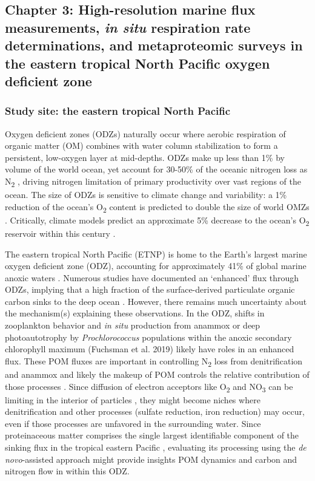 \documentclass[12pt, letterpaper, twoside]{article}
\begin{document}
\subsection{Chapter 3: High-resolution marine flux measurements, \textit{in situ} respiration rate determinations, and metaproteomic surveys in the eastern tropical North Pacific oxygen deficient zone}

\subsubsection{Study site: the eastern tropical North Pacific}

Oxygen deficient zones (ODZs) naturally occur where aerobic respiration of organic matter (OM) combines with water column stabilization to form a persistent, low-oxygen layer at mid-depths. ODZs make up less than 1\% by volume of the world ocean, yet account for 30-50\% of the oceanic nitrogen loss as N\textsubscript{2} \cite{devries_marine_2013}, driving nitrogen limitation of primary productivity over vast regions of the ocean. The size of ODZs is sensitive to climate change and variability: a 1\% reduction of the ocean’s  O\textsubscript{2} content is predicted to double the size of world OMZs \cite{deutsch_climate-forced_2011}. Critically, climate models predict an approximate 5\% decrease to the ocean’s O\textsubscript{2} reservoir within this century \cite{bopp_multiple_2013}. 

The eastern tropical North Pacific (ETNP) is home to the Earth’s largest marine oxygen deficient zone (ODZ), accounting for approximately 41\% of global marine anoxic waters \cite{paulmier_oxygen_2009}. Numerous studies have documented an ‘enhanced’ flux through ODZs, implying that a high fraction of the surface-derived particulate organic carbon sinks to the deep ocean \cite{devol_role_2001, van_mooy_impact_2002, keil_multiproxy_2016}. However, there remains much uncertainty about the mechanism(s) explaining these observations. In the ODZ, shifts in zooplankton behavior \cite{keil_multiproxy_2016} and \textit{in situ} production from anammox \cite{ganesh_single_2018} or deep photoautotrophy by \textit{Prochlorococcus} populations within the anoxic secondary chlorophyll maximum (Fuchsman et al. 2019) likely have roles in an enhanced flux. These POM fluxes are important in controlling N\textsubscript{2} loss from denitrification and anammox \cite{fuchsman_cyanobacteria_2019} and likely the makeup of POM controls the relative contribution of those processes \cite{babbin_organic_2014}. Since diffusion of electron acceptors like O\textsubscript{2} and NO\textsubscript{3} can be limiting in the interior of particles \cite{ploug_ballast_2008, ploug_small-scale_2001, bianchi_global_2018}, they might become niches where denitrification and other processes (sulfate reduction, iron reduction) may occur, even if those processes are unfavored in the surrounding water.  Since proteinaceous matter comprises the single largest identifiable component of the sinking flux in the tropical eastern Pacific \cite{wakeham_molecular_1997}, evaluating its processing using the \textit{de novo}-assisted approach might provide insights POM dynamics and carbon and nitrogen flow in within this ODZ. 
\end{document}
